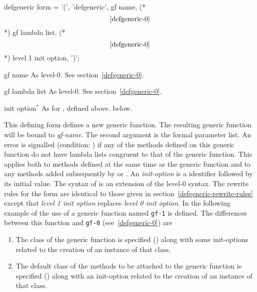 \begin{optDefinition}
\label{defgeneric-1}
%
\Syntax
\savesyntax{}\vbox{\small\syntax
defgeneric form
   = '(', 'defgeneric',
     gf name, (* \[\ref{defgeneric-0}\] *)
     gf lambda list, (* \[\ref{defgeneric-0}\] *)
     {level 1 init option}, ')';
\endsyntax}
%
\begin{arguments}
    \item[gf name] As level-0.  See section~\ref{defgeneric-0}.

    \item[gf lambda list] As level-0.  See section~\ref{defgeneric-0}.

    \item[init option\/$^*$] As for , defined above.
    below.
\end{arguments}
%
\remarks%
This defining form defines a new generic function.  The resulting generic
function will be bound to {\em gf-name}.  The second argument is the formal
parameter list.  An error is signalled (condition:
) if any of the methods defined on
this generic function do not have lambda lists congruent to that of the generic
function.  This applies both to methods defined at the same time as the generic
function and to any methods added subsequently by  or
.  An {\em init-option} is a identifier followed by its
initial value.  The syntax of  is an extension of the
level-0 syntax.  The rewrite rules for the  form are
identical to those given in section~\ref{defgeneric-rewrite-rules} except that
{\em level 1 init option} replaces {\em level 0 init option}.
%
\examples
In the following example of the use of  a generic
function named {\tt gf-1} is defined.  The differences between this
function and {\tt gf-0} (see~\ref{defgeneric-0}) are
\begin{enumerate}
    \item The class of the generic function is specified
    () along with some init-options related to the
    creation of an instance of that class.

    \item The default class of the methods to be attached to the generic
    function is specified () along with an
    init-option related to the creation of an instance of that class.


\end{enumerate}
\end{optDefinition}
